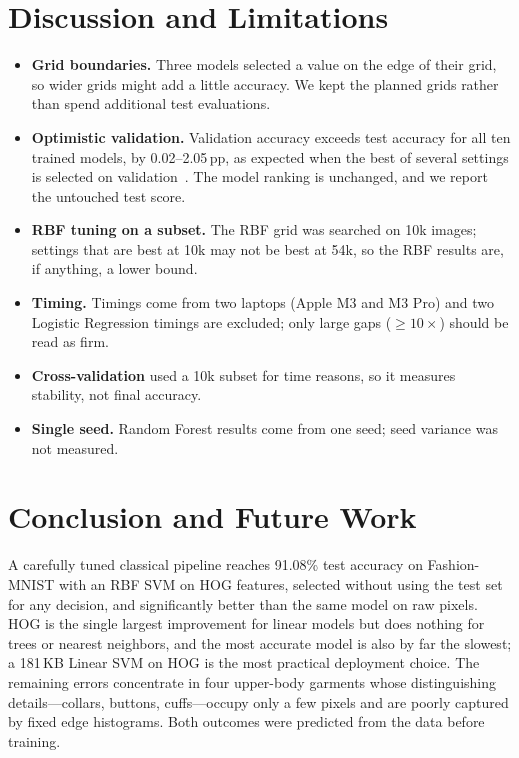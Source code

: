 \documentclass[conference]{IEEEtran}
\newcommand{\pp}{\,pp}                       %
\begin{document}
\section{Discussion and Limitations}
\label{sec:discussion}
\begin{itemize}
  \item \textbf{Grid boundaries.} Three models selected a value on the edge of their grid, so wider grids might add a
        little accuracy. We kept the planned grids rather than spend additional test evaluations.
  \item \textbf{Optimistic validation.} Validation accuracy exceeds test accuracy for all ten trained models, by
        0.02--2.05\pp, as expected when the best of several settings is selected on validation~\cite{cawley2010overfitting}.
        The model ranking is unchanged, and we report the untouched test score.
  \item \textbf{RBF tuning on a subset.} The RBF grid was searched on 10k images; settings that are best at 10k may not be
        best at 54k, so the RBF results are, if anything, a lower bound.
  \item \textbf{Timing.} Timings come from two laptops (Apple M3 and M3 Pro) and two Logistic Regression timings are
        excluded; only large gaps ($\ge10\times$) should be read as firm.
  \item \textbf{Cross-validation} used a 10k subset for time reasons, so it measures stability, not final accuracy.
  \item \textbf{Single seed.} Random Forest results come from one seed; seed variance was not measured.
\end{itemize}

\section{Conclusion and Future Work}
\label{sec:conclusion}
A carefully tuned classical pipeline reaches 91.08\% test accuracy on Fashion-MNIST with an RBF SVM on HOG features,
selected without using the test set for any decision, and significantly better than the same model on raw pixels. HOG is
the single largest improvement for linear models but does nothing for trees or nearest neighbors, and the most accurate
model is also by far the slowest; a 181\,KB Linear SVM on HOG is the most practical deployment choice. The remaining errors
concentrate in four upper-body garments whose distinguishing details---collars, buttons, cuffs---occupy only a few pixels
and are poorly captured by fixed edge histograms. Both outcomes were predicted from the data before training.
\end{document}
